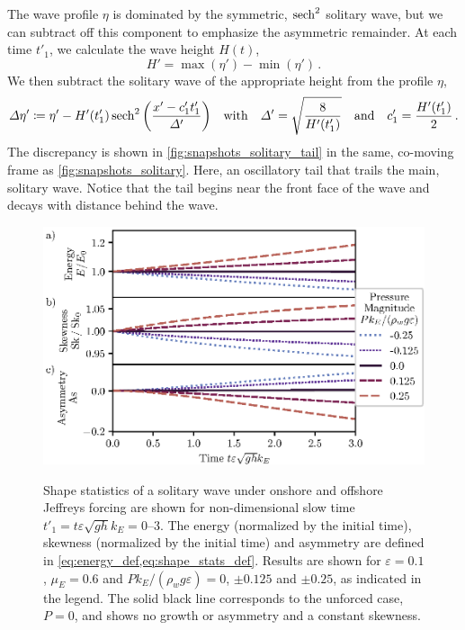 \documentclass{jfm}
\renewcommand*{\epsilon}{\varepsilon}
\begin{document}
The wave profile $\eta$ is dominated by the symmetric, $\sech^2$
solitary wave, but we can subtract off this component to emphasize the
asymmetric remainder.
At each time $t'_1$, we calculate the wave height $H(t)$,
\begin{equation}
  H' = \max(\eta') - \min(\eta') \,.
  \label{eq:height_def}
\end{equation}
We then subtract the solitary wave of the appropriate height from the
profile $\eta$,
\begin{equation}
  \Delta \eta' \coloneqq \eta'
    - H'(t'_1) \sech^2\pqty{\frac{x' - c'_1 t'_1}{\Delta'}}
  \qq{with}
  \Delta' = \sqrt{\frac{8}{H'(t'_1)}}
  \qq{and}
  c'_1 = \frac{H'(t'_1)}{2} \,.
  \label{eq:profile_discrepancy}
\end{equation}
The discrepancy is shown in \cref{fig:snapshots_solitary_tail} in the
same, co-moving frame as \cref{fig:snapshots_solitary}.
Here, an oscillatory tail that trails the main, solitary wave.
Notice that the tail begins near the front face of the wave and decays
with distance behind the wave.

\begin{figure}
  \centering
  { %
    \label{fig:statistics_solitary:a}
    \label{fig:statistics_solitary:b}
    \label{fig:statistics_solitary:c}
  }
  \includegraphics{Skew-Asymm-Production.eps}
  \caption{
    Shape statistics of a solitary wave under onshore and offshore
    Jeffreys forcing are shown for non-dimensional slow time $t'_1 = t
    \epsilon \sqrt{gh} k_E = \numrange{0}{3}$.
    The
    energy (normalized by the initial time),
    skewness (normalized by the initial time) and
    asymmetry are defined in
    \cref{eq:energy_def,eq:shape_stats_def}.
    Results are shown for $\epsilon=0.1$, $\mu_E = 0.6$ and $P
    k_E/(\rho_w g \epsilon) = 0$, $\pm 0.125$ and $\pm 0.25$, as
    indicated in the legend.
    The solid black line corresponds to the unforced case, $P = 0$, and
    shows no growth or asymmetry and a constant skewness.
  }\label{fig:statistics_solitary}
\end{figure}
\end{document}
